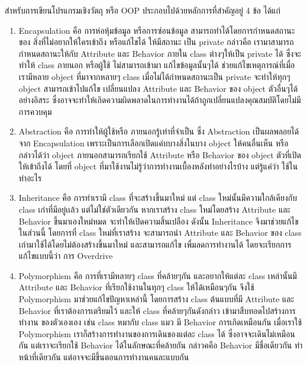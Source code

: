 \enskip \enskip \enskip \enskip \enskip สำหรับการเขียนโปรแกรมเชิงวัตถุ หรือ OOP ประกอบไปด้วยหลักการที่สำคัญอยู่ 4 ข้อ ได้แก่ 

\begin{enumerate}
\item Encapsulation คือ การห่อหุ้มข้อมูล หรือการซ่อนข้อมูล สามารถทำได้โดยการกำหนดสถานะของ สิ่งที่ไม่อยากให้ใครเข้าถึง หรือแก้ไขได้ ให้มีสถานะ
เป็น private กล่าวคือ เรามาสามารถกำหนดสถานะให้กับ Attribute และ Behavior ภายใน class ต่างๆให้เป็น private ได้ ซึ่งจะทำให้ class ภายนอก หรือผู้ใช้ ไม่สามารถเข้ามา
แก้ไขข้อมูลนั้นๆได้ ช่วยแก้ไขเหตุการณ์ที่เมื่อเรามีหลาย object ที่มาจากหลายๆ class เมื่อไม่ได้กำหนดสถานะเป็น private จะทำให้ทุกๆ object สามารถเข้าไปแก้ไข เปลี่ยนแปลง Attribute 
และ Behavior ของ object ตัวอื่นๆได้อย่างอิสระ ซึ่งอาจจะทำให้เกิดความผิดพลาดในการทำงานได้ถ้าถูกเปลี่ยนแปลงคุณสมบัติโดยไม่มีการควบคุม  
\item Abstraction คือ การทำให้ผู้ใช้หรือ ภายนอกรู้เท่าที่จำเป็น ซึ่ง Abstraction เป็นผลพลอยได้จาก Encapsulation เพราะเป็นการเลือกเปิดแค่บบางสิ่งในบาง object ให้คนอื่นเห็น หรือกล่าวได้ว่า
object ภายนอกสามารถเรียกใช้ Attribute หรือ Behavior ของ object ตัวที่เปิดให้เข้าถึงได้ โดยที่ object ที่มาใช้งานไม่รู้ว่าการทำงานเบื้องหลังทำอย่างไรบ้าง แต่รู้แค่ว่า ใช้ในทำอะไร
\item Inheritance คือ การทำเรามี class ที่จะสร้างขึ้นมาใหม่ แต่ class ใหม่นั้นมีความใกล้เคียงกับ class เก่าที่มีอยู่เเล้ว แต่ไม่ใช่ตัวเดียวกัน หากเราสร้าง class ใหม่โดยสร้าง Attribute และ Behavior ขึ้นมาเองใหม่หมด
จะทำให้เปิดความสิ้นเปลือง ดังนั้น Inheritance จึงมาช่วยแก้ไขในส่วนนี้ โดยการที่ class ใหม่ที่เราสร้าง จะสามารถนำ Attribute และ Behavior ของ class เก่ามาใช้ได้โดยไม่ต้องสร้างขึ้นมาใหม่ และสามารถแก้ไข เพื่มลดการทำงานได้ 
โดยจะเรียกการแก้ไขแบบนี้ว่า การ Overdrive 
\item Polymorphism คือ การที่เรามีหลายๆ class ที่คล้ายๆกัน และอยากให้แต่ละ class เหล่านั้นมี Attribute และ Behavior ที่เรียกใช้งานในทุกๆ class ให้ได้เหมือนๆกัน
จึงใช้ Polymorphism มาช่วยแก้ไขปัญหาเหล่านี้ โดยการสร้าง class ต้นแบบที่มี Attribute และ Behavior ที่เราต้องการเตรียมไว้ และให้ class ที่คล้ายๆกันดังกล่าว เข้ามาสืบทอดไปสร้างการทำงาน
ของตัวเองเอง เช่น class หมากับ class แมว มี Behavior การเกิดเหมือนกัน เมื่อเราใช้ Polymorphism เราก็สร้างการทำงานของการเดินของแต่ละ class ได้ ซึ่งอาจจะเดินไม่เหมือนกัน แต่เราจะเรียกใช้
 Behavior ได้ในลักษณะที่คล้ายกัน กล่าวคคือ Behavior มีชื่อเดียวกัน ทำหน้าที่เดียวกัน แต่อาจจะมีขึ้นตอนการทำงานคนละแบบกัน
\end{enumerate}


